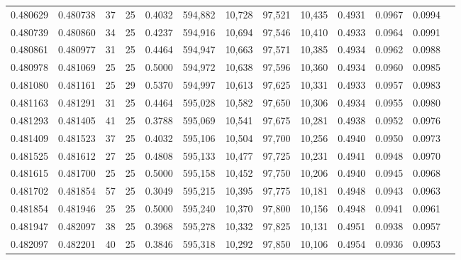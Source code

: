 \begin{tabular}{rrrrrrrrrrrrr}
0.480629 & 0.480738 &    37 &  25 &                                     0.4032 & 594,882 &  10,728 &  97,521 &  10,435 & 0.4931 & 0.0967 & 0.0994 \\
0.480739 & 0.480860 &    34 &  25 &                                     0.4237 & 594,916 &  10,694 &  97,546 &  10,410 & 0.4933 & 0.0964 & 0.0991 \\
0.480861 & 0.480977 &    31 &  25 &                                     0.4464 & 594,947 &  10,663 &  97,571 &  10,385 & 0.4934 & 0.0962 & 0.0988 \\
0.480978 & 0.481069 &    25 &  25 &                                     0.5000 & 594,972 &  10,638 &  97,596 &  10,360 & 0.4934 & 0.0960 & 0.0985 \\
0.481080 & 0.481161 &    25 &  29 &                                     0.5370 & 594,997 &  10,613 &  97,625 &  10,331 & 0.4933 & 0.0957 & 0.0983 \\
0.481163 & 0.481291 &    31 &  25 &                                     0.4464 & 595,028 &  10,582 &  97,650 &  10,306 & 0.4934 & 0.0955 & 0.0980 \\
0.481293 & 0.481405 &    41 &  25 &                                     0.3788 & 595,069 &  10,541 &  97,675 &  10,281 & 0.4938 & 0.0952 & 0.0976 \\
0.481409 & 0.481523 &    37 &  25 &                                     0.4032 & 595,106 &  10,504 &  97,700 &  10,256 & 0.4940 & 0.0950 & 0.0973 \\
0.481525 & 0.481612 &    27 &  25 &                                     0.4808 & 595,133 &  10,477 &  97,725 &  10,231 & 0.4941 & 0.0948 & 0.0970 \\
0.481615 & 0.481700 &    25 &  25 &                                     0.5000 & 595,158 &  10,452 &  97,750 &  10,206 & 0.4940 & 0.0945 & 0.0968 \\
0.481702 & 0.481854 &    57 &  25 &                                     0.3049 & 595,215 &  10,395 &  97,775 &  10,181 & 0.4948 & 0.0943 & 0.0963 \\
0.481854 & 0.481946 &    25 &  25 &                                     0.5000 & 595,240 &  10,370 &  97,800 &  10,156 & 0.4948 & 0.0941 & 0.0961 \\
0.481947 & 0.482097 &    38 &  25 &                                     0.3968 & 595,278 &  10,332 &  97,825 &  10,131 & 0.4951 & 0.0938 & 0.0957 \\
0.482097 & 0.482201 &    40 &  25 &                                     0.3846 & 595,318 &  10,292 &  97,850 &  10,106 & 0.4954 & 0.0936 & 0.0953 \\

\end{tabular}
